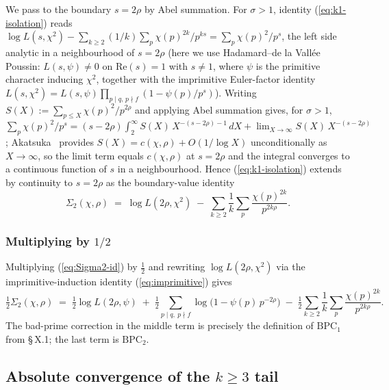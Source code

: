 We pass to the boundary \(s = 2\rho\) by Abel summation. For
\(\sigma > 1\), identity (\ref{eq:k1-isolation}) reads
\(\log L(s,\chi^2) - \sum_{k\ge 2}(1/k)\sum_p \chi(p)^{2k}/p^{ks}
= \sum_p \chi(p)^2/p^s\),
the left side analytic in a neighbourhood of \(s = 2\rho\) (here we
use Hadamard--de la Vallée Poussin: \(L(s, \psi) \ne 0\) on
\(\mathrm{Re}(s) = 1\) with \(s \ne 1\), where \(\psi\) is the primitive
character inducing \(\chi^2\), together with the imprimitive Euler-factor
identity \(L(s,\chi^2) = L(s,\psi)\prod_{p\mid q,\,p\nmid f}(1 - \psi(p)/p^s)\)).
Writing \(S(X) := \sum_{p \le X} \chi(p)^2/p^{2\rho}\) and applying
Abel summation gives, for \(\sigma > 1\),
\(\sum_p \chi(p)^2/p^s = (s - 2\rho)\int_2^\infty S(X)\,X^{-(s - 2\rho) - 1}\,dX
+ \lim_{X\to\infty} S(X)\,X^{-(s-2\rho)}\);
Akatsuka~\cite[Lemma~2.1 \& eq.~(2.5)]{AkatsukaH2013EulerProduct} provides \(S(X) = c(\chi,\rho) + O(1/\log X)\)
unconditionally as \(X \to \infty\), so the limit term equals
\(c(\chi,\rho)\) at \(s = 2\rho\) and the integral converges to a
continuous function of \(s\) in a neighbourhood. Hence
(\ref{eq:k1-isolation}) extends by continuity to \(s = 2\rho\) as the
boundary-value identity
\begin{equation}
\label{eq:Sigma2-id}
\Sigma_2(\chi,\rho)
\;=\;
\log L(2\rho, \chi^2)
\;-\; \sum_{k \ge 2} \frac{1}{k} \sum_{p}
\frac{\chi(p)^{2k}}{p^{2k\rho}}.
\end{equation}

\subsubsection{Multiplying by \(1/2\)}

Multiplying (\ref{eq:Sigma2-id}) by \(\tfrac12\) and rewriting
\(\log L(2\rho, \chi^2)\) via the imprimitive-induction identity
(\ref{eq:imprimitive}) gives
\begin{equation}
\label{eq:k=2-final}
\tfrac{1}{2} \Sigma_2(\chi,\rho)
\;=\;
\tfrac{1}{2} \log L(2\rho, \psi)
\;+\; \tfrac{1}{2}\!\sum_{p \mid q,\ p \nmid f}\!\log\!\bigl(1 - \psi(p)\,p^{-2\rho}\bigr)
\;-\; \tfrac{1}{2} \sum_{k \ge 2} \frac{1}{k} \sum_{p}
\frac{\chi(p)^{2k}}{p^{2k\rho}}.
\end{equation}
The bad-prime correction in the middle term is precisely the
definition of \(\mathrm{BPC}_1\) from \S\,X.1; the last term is
\(\mathrm{BPC}_2\).

\subsection{Absolute convergence of the \(k \ge 3\) tail}

